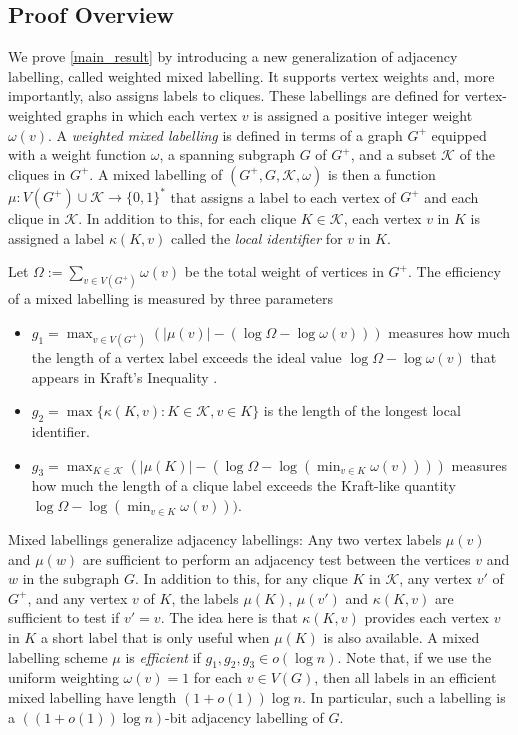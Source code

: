 \documentclass{patmorin}
\newcommand{\defin}[1]{\emph{\textcolor{brightmaroon}{#1}}}
\newcommand{\calK}{\mathcal{K}}
\begin{document}
\subsection{Proof Overview}
\label{ssec:overview}


We prove \cref{main_result} by introducing a new generalization of adjacency labelling, called weighted mixed labelling. It supports vertex weights and, more importantly, also assigns labels to cliques. These labellings are defined for vertex-weighted graphs in which each vertex $v$ is assigned a positive integer weight $\omega(v)$.  A \defin{weighted mixed labelling} is defined in terms of a graph $G^+$ equipped with a weight function $\omega$, a spanning subgraph $G$ of $G^+$, and a subset $\calK$ of the cliques in $G^+$. A mixed labelling of $(G^+,G,\calK,\omega)$ is then a function $\mu:V(G^+)\cup\calK\to\{0,1\}^*$ that assigns a label to each vertex of $G^+$ and each clique in $\calK$.  In addition to this, for each clique $K\in\calK$, each vertex $v$ in $K$ is assigned a label $\kappa(K,v)$ called the \defin{local identifier} for $v$ in $K$.

Let $\Omega:=\sum_{v\in V(G^+)}\omega(v)$ be the total weight of vertices in $G^+$.  The efficiency of a mixed labelling is measured by three parameters
\begin{itemize}
    \item $g_1=\max_{v\in V(G^+)} (|\mu(v)|-(\log\Omega - \log\omega(v)))$ measures how much the length of a vertex label exceeds the ideal value $\log\Omega-\log\omega(v)$ that appears in Kraft's Inequality \cite{Kraft1949}.
    \item $g_2=\max\{\kappa(K,v):K\in\calK, v\in K\}$ is the length of the longest local identifier.
    \item $g_3=\max_{K\in\calK} (|\mu(K)|-(\log\Omega - \log(\min_{v\in K}\omega(v))))$ measures how much the length of a clique label exceeds the Kraft-like quantity $\log\Omega - \log(\min_{v\in K}\omega(v)))$.
\end{itemize}


Mixed labellings generalize adjacency labellings: Any two vertex labels $\mu(v)$ and $\mu(w)$ are sufficient to perform an adjacency test between the vertices $v$ and $w$ in the subgraph $G$.  In addition to this, for any clique $K$ in $\calK$, any vertex $v'$ of $G^+$, and any vertex $v$ of $K$, the labels $\mu(K)$, $\mu(v')$ and $\kappa(K,v)$ are sufficient to test if $v'=v$.  The idea here is that $\kappa(K,v)$ provides each vertex $v$ in $K$ a short label that is only useful when $\mu(K)$ is also available.   A mixed labelling scheme $\mu$ is \defin{efficient} if $g_1,g_2,g_3\in o(\log n)$.  Note that, if we use the uniform weighting $\omega(v)=1$ for each $v\in V(G)$, then all labels in an efficient mixed labelling have length $(1+o(1))\log n$.  In particular, such a labelling is a $((1+o(1))\log n)$-bit adjacency labelling of $G$.
\end{document}
